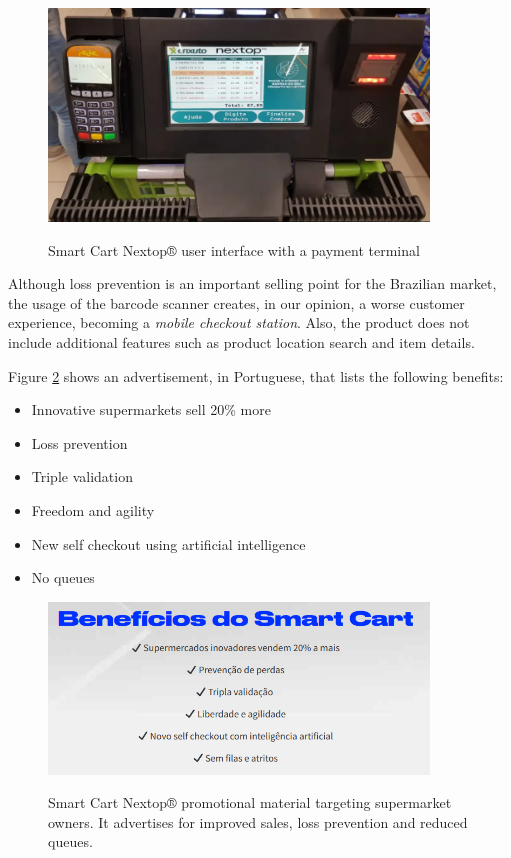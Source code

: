 \begin{figure}[H]
	\centering
    \caption[Smart Cart Nextop® user interface with a payment terminal]{Smart Cart Nextop® user interface with a payment terminal}
	\includegraphics[width=0.9\textwidth]{./images/nextop2.png}
	\label{fig:nextopui}
\end{figure}

Although loss prevention is an important selling point for the Brazilian market,
the usage of the barcode scanner creates, in our opinion, a worse customer
experience, becoming a \textit{mobile checkout station}. Also, the product does not
include additional features such as product location search and item details. 

Figure \ref{fig:nextopad} shows an advertisement, in Portuguese, that lists the following
benefits:

\begin{itemize}
    \item Innovative supermarkets sell 20\% more
    \item Loss prevention
    \item Triple validation
    \item Freedom and agility
    \item New self checkout using artificial intelligence
    \item No queues
\end{itemize}

\begin{figure}[H]
	\centering
    \caption[Smart Cart Nextop® promotional material targetting supermarket owners]{Smart Cart Nextop® promotional material targeting supermarket owners. It advertises for improved sales, loss prevention and reduced queues.}
	\includegraphics[width=0.9\textwidth]{./images/nextoppromo.png}
	\label{fig:nextopad}
\end{figure}

